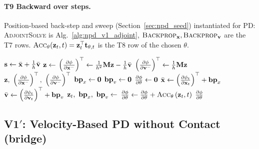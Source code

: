 \paragraph{T9 Backward over steps.}\mbox{}
\newline Position-based back-step and sweep (Section~\ref{sec:npd_seed}) instantiated for PD: \textsc{AdjointSolve} is Alg.~\ref{alg:npd_v1_adjoint}, $\textsc{Backprop}_{\mathbf{x}}, \textsc{Backprop}_{\mathbf{v}}$ are the T7 rows. $\textsc{Acc}_\theta(\mathbf{z}_t, t) = \mathbf{z}_t^\top\mathbf{t}_{\theta,t}$ is the T8 row of the chosen $\theta$.
\begin{algorithm}[H]
\caption{V1: one back-step, and the backward pass over all steps with a generic parameter accumulator.}
\label{alg:npd_v1_backward}
\begin{algorithmic}[1]
    \State $\mathbf{s} \gets \bar{\mathbf{x}} + \tfrac{1}{h}\bar{\mathbf{v}}$ 
    \State $\mathbf{z} \gets$  
    \State $\left(\frac{\partial \phi}{\partial \mathbf{x}^-}\right)^\top \gets \tfrac{1}{h^2}\mathbf{M}\mathbf{z} - \tfrac{1}{h}\bar{\mathbf{v}}$ 
    \State $\left(\frac{\partial \phi}{\partial \mathbf{v}^-}\right)^\top \gets \tfrac{1}{h}\mathbf{M}\mathbf{z}$ 
    \State \Return $\z,\ \left(\pdc{\phi}{\x^-}\right)^\top,\ \left(\pdc{\phi}{\vv^-}\right)^\top$
\EndFunction
\Statex
{}
    \State $\mathbf{bp}_x \gets \mathbf{0}$
    \State $\mathbf{bp}_v \gets \mathbf{0}$
    \State $\frac{\partial \phi}{\partial \theta} \gets \mathbf{0}$ 
        \State $\bar{\mathbf{x}} \gets \left(\frac{\partial \phi_t}{\partial \mathbf{x}_t}\right)^\top + \mathbf{bp}_x$
        \State $\bar{\mathbf{v}} \gets \left(\frac{\partial \phi_t}{\partial \mathbf{v}_t}\right)^\top + \mathbf{bp}_v$
        \State $\mathbf{z}_t,\ \mathbf{bp}_x,\ \mathbf{bp}_v \gets$ 
        \State $\frac{\partial \phi}{\partial \theta} \gets \frac{\partial \phi}{\partial \theta} + \textsc{Acc}_\theta\left(\mathbf{z}_t, t\right)$ 
    \EndFor
    \State \Return $\frac{\partial \phi}{\partial \theta}$
\EndFunction
\end{algorithmic}
\end{algorithm}

\subsection{V1$'$: Velocity-Based PD without Contact (bridge)}
\label{sec:npd_v1p}

